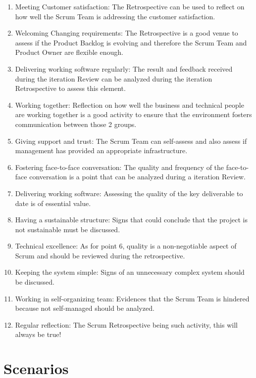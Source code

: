 \begin{enumerate}
\item Meeting Customer satisfaction: The Retrospective can be used to reflect on how well the Scrum Team is addressing the customer satisfaction.
\item Welcoming Changing requirements: The Retrospective is a good venue to assess if the Product Backlog is evolving and therefore the Scrum Team and Product Owner are flexible enough.
\item Delivering working software regularly: The result and feedback received during the iteration Review can be analyzed during the iteration Retrospective to assess this element.
\item Working together: Reflection on how well the business and technical people are working together is a good activity to ensure that the environment fosters communication between those 2 groups.
\item Giving support and trust: The Scrum Team can self-assess and also assess if management has provided an appropriate infrastructure.
\item Fostering face-to-face conversation: The quality and frequency of the face-to-face conversation is a point that can be analyzed during a iteration Review.
\item Delivering working software: Assessing the quality of the key deliverable to date is of essential value.
\item Having a sustainable structure: Signs that could conclude that the project is not sustainable must be discussed.
\item Technical excellence: As for point 6, quality is a non-negotiable aspect of Scrum and should be reviewed during the retrospective.
\item Keeping the system simple: Signs of an unnecessary complex system should be discussed.
\item Working in self-organizing team: Evidences that the Scrum Team is hindered because not self-managed should be analyzed.
\item Regular reflection: The Scrum Retrospective being such activity, this will always be true!
\end{enumerate}

\section{Scenarios}
\label{sec:scenarios}

